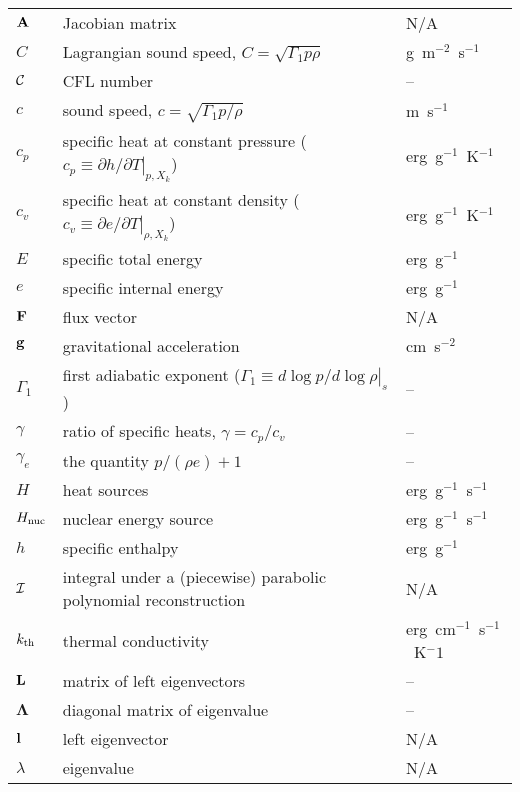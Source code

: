 \begin{center}
\begin{longtable}{|l|p{3.25in}|l|}
\hline 
\endlastfoot
${\bf A}$     & Jacobian matrix  & N/A \\
%
$C$       & Lagrangian sound speed, $C = \sqrt{\Gamma_1 p \rho}$ & g~m$^{-2}$~s$^{-1}$\\
%
${\mathcal{C}}$    & CFL number & --\\
%
$c$     & sound speed, $c = \sqrt{\Gamma_1 p/\rho}$  & m~s$^{-1}$ \\
%
$c_p$   & specific heat at constant pressure
          ($c_p \equiv \left . \partial h / \partial T \right |_{p,X_k}$)
        & erg~g$^{-1}$~K$^{-1}$ \\
%
$c_v$   & specific heat at constant density
          ($c_v \equiv \left . \partial e / \partial T \right |_{\rho,X_k}$)
        & erg~g$^{-1}$~K$^{-1}$ \\
%
$E$     & specific total energy                      & erg~g$^{-1}$ \\
%
$e$     & specific internal energy                   & erg~g$^{-1}$ \\
%
${\bf F}$     & flux vector                                & N/A \\
%
${\bf g}$     & gravitational acceleration                 & cm~s$^{-2}$ \\
%
$\Gamma_1$ & first adiabatic exponent ($\Gamma_1 \equiv \left . d \log p/d \log \rho \right |_s$) & -- \\
%
$\gamma$ & ratio of specific heats, $\gamma = c_p/c_v$ & -- \\
%
$\gamma_e$ & the quantity $p/(\rho e) + 1$ & -- \\
%
$H$     & heat sources                               & erg~g$^{-1}$~s$^{-1}$ \\
%
${H_\mathrm{nuc}}$     & nuclear energy source                               & erg~g$^{-1}$~s$^{-1}$ \\
%
$h$     & specific enthalpy                          & erg~g$^{-1}$ \\
%
${\mathcal{I}}$   & integral under a (piecewise) parabolic polynomial reconstruction & N/A \\
%
${k_\mathrm{th}}$  & thermal conductivity                       & erg~cm$^{-1}$~s$^{-1}$~K$^-1$ \\
%
${\bf L}$ & matrix of left eigenvectors              & -- \\
%
${\boldsymbol{\Lambda}}$ & diagonal matrix of eigenvalue & -- \\
%
${\bf l}$     & left eigenvector                           & N/A \\
%
$\lambda$ & eigenvalue                               & N/A \\

\end{longtable}
\end{center}
